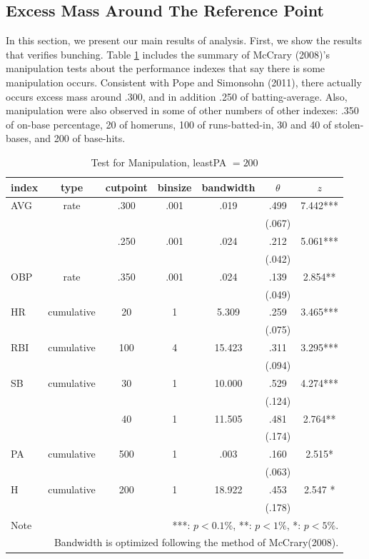 \documentclass[dvipdfmx, 12pt]{article}
\begin{document}
\subsection{Excess Mass Around The Reference Point}

In this section, we present our main results of analysis. First, we show the results that verifies bunching. Table \ref{Bunch-True} includes the summary of McCrary (2008)'s manipulation tests about the performance indexes that say there is some manipulation occurs. Consistent with Pope and Simonsohn (2011), there actually occurs excess mass around .300, and in addition .250 of batting-average. Also, manipulation were also observed in some of other numbers of other indexes: .350 of on-base percentage, 20 of homeruns, 100 of runs-batted-in, 30 and 40 of stolen-bases, and 200 of base-hits.

\begin{table}
  \small
  \centering
  \begin{tabular}{lcccccc}\hline
    index & type & cutpoint & binsize & bandwidth & $\theta$ & $z$
    \\ \hline \hline
    AVG & rate & .300 & .001 & .019 &  .499 & 7.442*** \\
    & & & & & (.067) & \\
    & & .250 & .001 & .024 & .212 & 5.061*** \\
    & & & & & (.042) & \\
    OBP & rate & .350 & .001 & .024 &  .139 & 2.854** \\
    & & & & & (.049) &  \\
    HR & cumulative & 20 & 1 & 5.309 & .259 & 3.465*** \\
    & & & & & (.075)  & \\
    RBI & cumulative & 100 & 4 & 15.423 & .311 & 3.295*** \\
    & & & & & (.094) & \\
    SB & cumulative & 30 & 1 & 10.000 & .529 & 4.274*** \\
    & & & & & (.124) & \\
    & & 40 & 1 & 11.505 & .481 & 2.764** \\
    & & & & & (.174) & \\
    PA & cumulative & 500 & 1 & .003 & .160 & 2.515* \\
    & & & & &(.063) & \\
    H & cumulative & 200 & 1 & 18.922 & .453 & 2.547 * \\
    & & & & & (.178) & \\ \hline \hline
    Note & \multicolumn{6}{r}{
    ***: $p<0.1\%$, **: $p<1\%$, *: $p<5\%$.
    }\\
    \multicolumn{7}{r}{
    Bandwidth is optimized following the method of McCrary(2008).
    }
  \end{tabular}
  \caption{Test for Manipulation, leastPA $= 200$}
  \label{Bunch-True}
\end{table}
\end{document}
